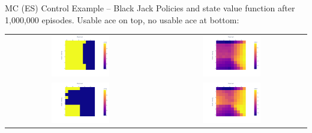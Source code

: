 \documentclass[ignorenonframetext,xcolor=x11names]{beamer}
\begin{document}
\begin{frame}{MC (ES) Control Example -- Black Jack}
Policies and state value function after 1,000,000 episodes. Usable ace on top, no usable ace at bottom:
\vspace{.5\baselineskip}

\begin{center}
\begin{tabular}{cc}
\includegraphics[width=0.4\textwidth]{rl_into/blackjack_es/blackjack_pi_iteration_1000000_ace1.png} &
\includegraphics[width=0.4\textwidth]{rl_into/blackjack_es/blackjack_v_iteration_1000000_ace1.png} \\
\includegraphics[width=0.4\textwidth]{rl_into/blackjack_es/blackjack_pi_iteration_1000000_ace0.png} &
\includegraphics[width=0.4\textwidth]{rl_into/blackjack_es/blackjack_v_iteration_1000000_ace0.png}
\end{tabular}
\end{center}
\end{frame}
\end{document}
